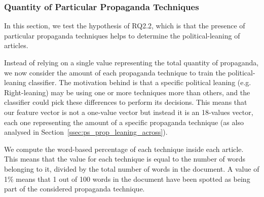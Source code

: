 



\subsubsection{Quantity of Particular Propaganda Techniques}

In this section, we test the hypothesis of RQ2.2, which is that the presence of particular propaganda techniques helps to determine the political-leaning of articles. 

Instead of relying on a single value representing the total quantity of propaganda, we now consider the amount of each propaganda technique to train the political-leaning classifier.
The motivation behind is that a specific political leaning (e.g. Right-leaning) may be using one or more techniques more than others, and the classifier could pick these differences to perform its decisions.
This means that our feature vector is not a one-value vector but instead it is an 18-values vector, each one representing the amount of a specific propaganda technique (as also analysed in Section~\ref{ssec:ps_prop_leaning_across}).


We compute the word-based percentage of each technique inside each article. This means that the value for each technique is equal to the number of words belonging to it, divided by the total number of words in the document. A value of 1\% means that 1 out of 100 words in the document have been spotted as being part of the considered propaganda technique.


